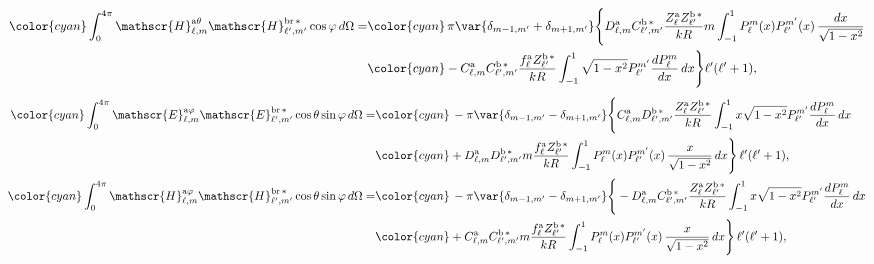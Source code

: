 \begin{align}
%
%
%
\color{cyan}\int_{0}^{4\pi} \mathscr{H}_{\ell, m}^{\text{a}\theta}\mathscr{H}_{\ell^{\prime}, m^{\prime}}^{\text{br}\,*} \cos\varphi \, d\Omega =& 
%
\color{cyan}\, \pi \var{ \delta_{m-1, m^{\prime}} + \delta_{m+1, m^{\prime}} } \Bigg\{D_{\ell,m}^{\rm a}C_{\ell^{\prime}, m^{\prime}}^{\rm b \, *}\frac{Z_{\ell}^{\rm a}Z_{\ell^{\prime}}^{\rm b\, *}}{k R} m \int_{-1}^1 P_{\ell}^{m}(x) P_{\ell^{\prime}}^{m^{\prime}}(x) \, \frac{dx}{\sqrt{1-x^2}}\nonumber \\
%
&\color{cyan}-C_{\ell, m}^{\rm a}C_{\ell^{\prime}, m^{\prime}}^{\rm b \, *} \frac{f_{\ell}^{\rm a}Z_{\ell^{\prime}}^{\rm b \, *}}{k R} 
%
\int_{-1}^1 \sqrt{1-x^2} P_{\ell^{\prime}}^{m^{\prime}} \frac{dP_{\ell}^m}{dx} \,dx \Bigg\}\ell^{\prime}(\ell^{\prime}+1),
\end{align}
\vspace{-0.8cm}
\begin{align}
%
%
%
%
\color{cyan}\int_0^{4\pi}\mathscr{E}_{\ell, m}^{\text{a}\varphi}\mathscr{E}_{\ell^{\prime}, m^{\prime}}^{\text{br}\,*}\cos\theta\sin\varphi \, d\Omega
%
 =&\color{cyan} \, - \pi \var{ \delta_{m-1, m^{\prime}} - \delta_{m+1, m^{\prime}} } \Bigg\{ C_{\ell, m}^{\rm a} D_{\ell^{\prime}, m^{\prime}}^{\rm b \, *} \frac{Z_{\ell}^{\rm a} Z_{\ell^{\prime}}^{\rm b \, *}}{k R} \int_{-1}^1 x \sqrt{1-x^2} P_{\ell^{\prime}}^{m^{\prime}} \frac{dP_{\ell}^m}{dx} \,dx \nonumber \\ &
%
 \color{cyan}+ D_{\ell, m}^{\rm a} D_{\ell^{\prime}, m^{\prime}}^{\rm b \, *} m \frac{f_{\ell}^{\rm a} Z_{\ell^{\prime}}^{\rm b\, *}}{k R} \int_{-1}^1 P_{\ell}^{m}(x) P_{\ell^{\prime}}^{m^{\prime}}(x) \, \frac{x}{\sqrt{1-x^2}} \, dx \Bigg\} \, \ell^{\prime}(\ell^{\prime}+1), \\ 
%
%
% 
\color{cyan}\int_0^{4\pi}\mathscr{H}_{\ell, m}^{\text{a}\varphi}\mathscr{H}_{\ell^{\prime}, m^{\prime}}^{\text{br}\,*}\cos\theta\sin\varphi \, d\Omega
%
 =&\color{cyan} \, - \pi \var{ \delta_{m-1, m^{\prime}} - \delta_{m+1, m^{\prime}} } \Bigg\{ -D_{\ell, m}^{\rm a} C_{\ell^{\prime}, m^{\prime}}^{\rm b \, *} \frac{Z_{\ell}^{\rm a} Z_{\ell^{\prime}}^{\rm b \, *}}{k R} \int_{-1}^1 x \sqrt{1-x^2} P_{\ell^{\prime}}^{m^{\prime}} \frac{dP_{\ell}^m}{dx} \,dx \nonumber \\ &
%
\color{cyan} + C_{\ell, m}^{\rm a} C_{\ell^{\prime}, m^{\prime}}^{\rm b \, *} m \frac{f_{\ell}^{\rm a} Z_{\ell^{\prime}}^{\rm b\, *}}{k R} \int_{-1}^1 P_{\ell}^{m}(x) P_{\ell^{\prime}}^{m^{\prime}}(x) \, \frac{x}{\sqrt{1-x^2}} \, dx \Bigg\} \, \ell^{\prime}(\ell^{\prime}+1),  
% 
%
\end{align}
